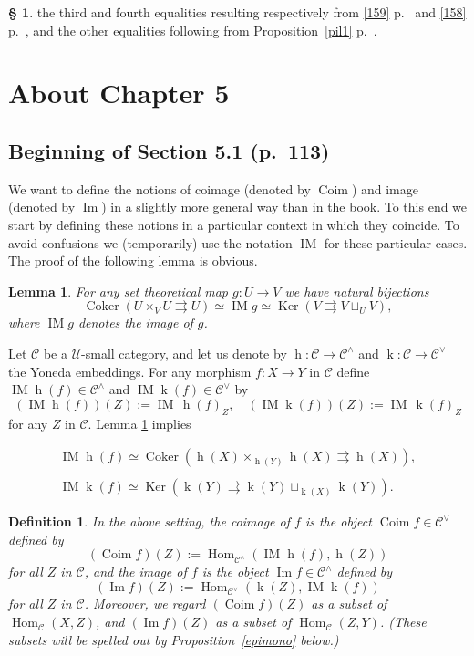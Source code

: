 \documentclass[12pt]{article}%
\newtheorem{lem}[thm]{Lemma}
\newtheorem{df}[thm]{Definition}%
\theoremstyle{remark}
\theoremstyle{definition}
\newtheorem{s}[thm]{\S}%
\newcommand{\nn}{\noindent}
\newcommand{\C}{\mathcal C}
\newcommand{\U}{\mathcal U}
\newcommand{\parar}{\rightrightarrows}
\DeclareMathOperator{\Coim}{Coim}
\DeclareMathOperator{\Coker}{Coker}
\DeclareMathOperator{\Ima}{Im}
\DeclareMathOperator{\IM}{IM}
\DeclareMathOperator{\hy}{h}
\DeclareMathOperator{\ky}{k}
\DeclareMathOperator{\Hom}{Hom}%
\DeclareMathOperator{\Ker}{Ker}
\begin{document}
\begin{s}
\nn the third and fourth equalities resulting respectively from \eqref{159} p.~\pageref{159} and \eqref{158} p.~\pageref{158}, and the other equalities following from Proposition~\ref{pil1} p.~\pageref{pil1}.%
\end{s}


\section{About Chapter 5}

\subsection{Beginning of Section 5.1 (p.~113)}

We want to define the notions of coimage (denoted by $\Coim$) and image (denoted by $\Ima$) in a slightly more general way than in the book. To this end we start by defining these notions in a particular context in which they coincide. To avoid confusions we (temporarily) use the notation $\IM$ for these particular cases. The proof of the following lemma is obvious. 

\begin{lem}\label{imset} 
For any set theoretical map $g:U\to V$ we have natural bijections 
$$ 
\Coker(U\times_VU\parar U)\simeq\IM g\simeq\Ker(V\parar V\sqcup_UV),
$$ 
where $\IM g$ denotes the image of $g$. 
\end{lem} 

Let $\C$ be a $\U$-small category, and let us denote by $\hy:\C\to\C^\wedge$ and $\ky:\C\to\C^\vee$ the Yoneda embeddings. For any morphism $f:X\to Y$ in $\C$ define $\IM\hy(f)\in\C^\wedge$ and $\IM\ky(f)\in\C^\vee$ by
$$
(\IM\hy(f))(Z):=\IM\,\hy(f)_Z,\quad(\IM\ky(f))(Z):=\IM\,\ky(f)_Z 
$$
for any $Z$ in $\C$. Lemma \ref{imset} implies

\begin{equation}\label{IM2}
\begin{split}
\IM\hy(f)\simeq\Coker(\hy(X)\times_{\hy(Y)}\hy(X)\parar\hy(X)),\\ \\ 
\IM\ky(f)\simeq\Ker(\ky(Y)\parar\ky(Y)\sqcup_{\ky(X)}\ky(Y)).
\end{split}
\end{equation}

\begin{df}\label{dci}
In the above setting, the {\em coimage}  of $f$ is the object $\Coim f\in\C^\vee$ defined by 
$$ 
(\Coim f)(Z):=\Hom_{\C^\wedge}(\IM\hy(f),\hy(Z))
$$ 
for all $Z$ in $\C$, and the {\em image}  of $f$ is the object $\Ima f\in\C^\wedge$ defined by 
$$ 
(\Ima f)(Z):=\Hom_{\C^\vee}(\ky(Z),\IM\ky(f)) 
$$ 
for all $Z$ in $\C$. Moreover, we regard $(\Coim f)(Z)$ as a subset of $\Hom_\C(X,Z)$, and $(\Ima f)(Z)$ as a subset of $\Hom_\C(Z,Y)$. (These subsets will be spelled out by Proposition~\ref{epimono} below.)
\end{df} 
\end{document}
